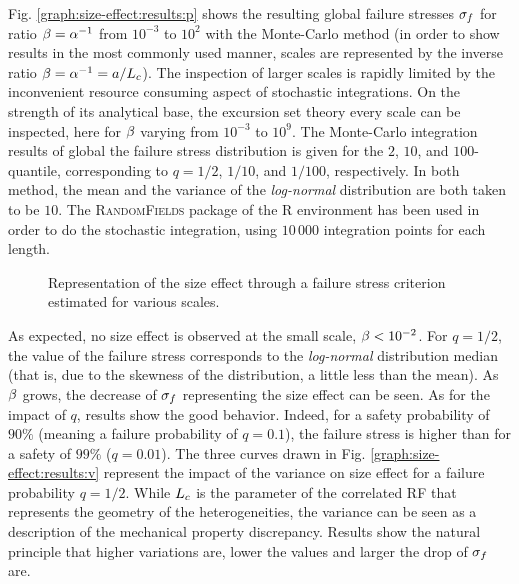 \documentclass[12pt]{article}
\begin{document}
\par Fig. \ref{graph:size-effect:results:p} shows the resulting global failure stresses $\sigma_f$ for ratio $\beta=\alpha^{-1}$ from $10^{-3}$ to $10^2$ with the Monte-Carlo method (in order to show results in the most commonly used manner, scales are represented by the inverse ratio $\beta=\alpha^{-1}=a/L_c$). The inspection of larger scales is rapidly limited by the inconvenient resource consuming aspect of stochastic integrations. On the strength of its analytical base, the excursion set theory every scale can be inspected, here for $\beta$ varying from $10^{-3}$ to $10^{9}$. The Monte-Carlo integration results of global the failure stress distribution is given for the $2$, $10$, and $100$-quantile, corresponding to $q=1/2$, $1/10$, and $1/100$, respectively. In both method, the mean and the variance of the \emph{log-normal} distribution are both taken to be $10$. The \textsc{RandomFields} package \cite{schlather_randomfields:_2012} of the \textsc{R} environment \cite{team_r:_2012} has been used in order to do the stochastic integration, using $10\,000$ integration points for each length. 
\begin{figure}[h!]
  \centering\hspace*{\fill}
  \hfill
  \hspace*{\fill}
  \caption{Representation of the size effect through a failure stress criterion estimated for various scales.\label{graph:size-effect:results}}
\end{figure}
\par As expected, no size effect is observed at the small scale, $\beta < 10^{-2}$. For $q=1/2$, the value of the failure stress corresponds to the \emph{log-normal} distribution median (that is, due to the skewness of the distribution, a little less than the mean). As $\beta$ grows, the decrease of $\sigma_f$ representing the size effect can be seen. As for the impact of $q$, results show the good behavior. Indeed, for a safety probability of $90\%$ (meaning a failure probability of $q=0.1$), the failure stress is higher than for a safety of $99\%$ ($q=0.01$). The three curves drawn in Fig. \ref{graph:size-effect:results:v} represent the impact of the variance on size effect for a failure probability $q=1/2$. While $L_c$ is the parameter of the correlated RF that represents the geometry of the heterogeneities, the variance can be seen as a description of the mechanical property discrepancy. Results show the natural principle that higher variations are, lower the values and larger the drop of $\sigma_f$ are.
\end{document}

